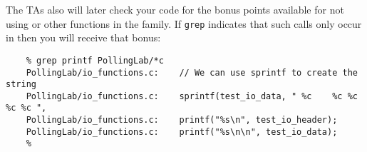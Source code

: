 The TAs also will later check your code for the bonus points available for not using  or other functions in the  family.
If \texttt{grep} indicates that such calls only occur in  then you will receive that bonus: \\
\begin{verbatim}
    % grep printf PollingLab/*c
    PollingLab/io_functions.c:    // We can use sprintf to create the string
    PollingLab/io_functions.c:    sprintf(test_io_data, " %c    %c %c   %c %c ",
    PollingLab/io_functions.c:    printf("%s\n", test_io_header);
    PollingLab/io_functions.c:    printf("%s\n\n", test_io_data);
    %
\end{verbatim}